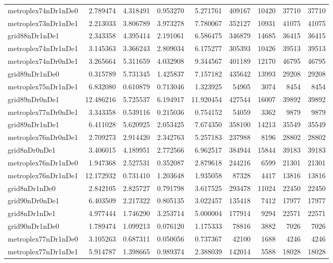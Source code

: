 \begin{longtable}{|l|r|r|r|r|r|r|r|r|}
metroplex74nDr1nDe0 & 2.789474 & 4.318491 & 0.953270 & 5.271761 & 409167 & 10420 & 37710 & 37710 \\
metroplex73nDr1nDe1 & 2.213033 & 3.806789 & 3.973278 & 7.780067 & 352127 & 10931 & 41075 & 41075 \\
grid88nDr1nDe1 & 2.343358 & 4.395414 & 2.191061 & 6.586475 & 346879 & 14685 & 36415 & 36415 \\
metroplex74nDr1nDe1 & 3.145363 & 3.366243 & 2.809034 & 6.175277 & 305393 & 10426 & 39513 & 39513 \\
metroplex74nDr0nDe1 & 3.265664 & 5.311659 & 4.032908 & 9.344567 & 401189 & 12170 & 46795 & 46795 \\
grid89nDr1nDe0 & 0.315789 & 5.731345 & 1.425837 & 7.157182 & 435642 & 13993 & 29208 & 29208 \\
metroplex75nDr1nDe1 & 6.832080 & 0.610879 & 0.713046 & 1.323925 & 54905 & 3074 & 8454 & 8454 \\
grid89nDr0nDe1 & 12.486216 & 5.725537 & 6.194917 & 11.920454 & 427544 & 16007 & 39892 & 39892 \\
metroplex77nDr0nDe1 & 3.343358 & 0.539116 & 0.215036 & 0.754152 & 54059 & 3362 & 9879 & 9879 \\
grid89nDr1nDe1 & 6.411028 & 5.620925 & 2.053425 & 7.674350 & 358100 & 14213 & 35549 & 35549 \\
metroplex76nDr0nDe1 & 2.709273 & 2.914420 & 2.342763 & 5.257183 & 237988 & 8196 & 28802 & 28802 \\
grid8nDr0nDe1 & 3.406015 & 4.189951 & 2.772566 & 6.962517 & 384944 & 15844 & 39183 & 39183 \\
metroplex76nDr1nDe0 & 1.947368 & 2.527531 & 0.352087 & 2.879618 & 244216 & 6599 & 21301 & 21301 \\
metroplex76nDr1nDe1 & 12.172932 & 0.731410 & 1.203648 & 1.935058 & 87328 & 4417 & 13816 & 13816 \\
grid8nDr1nDe0 & 2.842105 & 2.825727 & 0.791798 & 3.617525 & 293478 & 11024 & 22450 & 22450 \\
grid90nDr0nDe1 & 6.403509 & 2.217322 & 0.805135 & 3.022457 & 135418 & 7412 & 17977 & 17977 \\
grid8nDr1nDe1 & 4.977444 & 1.746290 & 3.253714 & 5.000004 & 177914 & 9294 & 22571 & 22571 \\
grid90nDr1nDe0 & 1.789474 & 1.099213 & 0.076120 & 1.175333 & 78816 & 3882 & 7026 & 7026 \\
metroplex77nDr1nDe0 & 3.105263 & 0.687311 & 0.050056 & 0.737367 & 42100 & 1688 & 4246 & 4246 \\
metroplex77nDr1nDe1 & 5.914787 & 1.398665 & 0.989374 & 2.388039 & 142014 & 5588 & 18028 & 18028 \\

\end{longtable}
